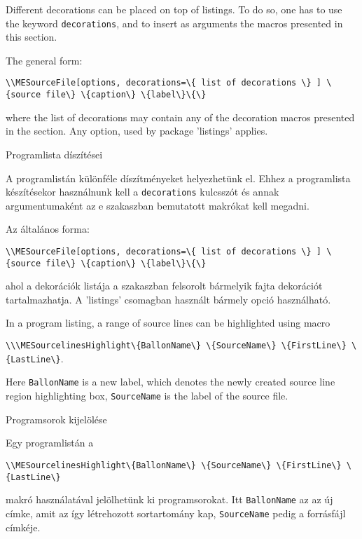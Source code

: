 {
Different decorations can be placed on top of listings.
To do so, one has to use the keyword  \lstinline|decorations|,
and to insert as arguments the macros presented in this section.

The general form:
\par\noindent\lstinline|\\MESourceFile[options,
decorations=\{
list of decorations
\}
] \{source file\} \{caption\} \{label\}\{\}|
\par\noindent where the list of decorations may contain any of the 
decoration macros presented in the section.
Any option, used by package 'listings' applies.
}
{Programlista díszítései}
{
A programlistán különféle díszítményeket helyezhetünk el.
Ehhez a programlista készítésekor használnunk kell a \lstinline|decorations| kulcsszót
és annak argumentumaként az e szakaszban bemutatott makrókat kell megadni.

Az általános forma:
\par\noindent\lstinline|\\MESourceFile[options,
decorations=\{
list of decorations
\}
] \{source file\} \{caption\} \{label\}\{\}|
\par\noindent ahol a dekorációk listája a szakaszban felsorolt 
bármelyik fajta dekorációt tartalmazhatja.
A 'listings' csomagban használt bármely opció használható.
}


{
In a program listing, a range of source lines can be highlighted using macro 
\par\noindent\lstinline|\\\MESourcelinesHighlight\{BallonName\} \{SourceName\} \{FirstLine\} \{LastLine\}|.
\par\noindent Here  \lstinline|BallonName| is a new label, which denotes the 
newly created source line region highlighting box, \lstinline|SourceName| 
is the label of the source file. 
}
{Programsorok kijelölése}
{
Egy programlistán a
\par\noindent\lstinline|\\MESourcelinesHighlight\{BallonName\} \{SourceName\} \{FirstLine\} \{LastLine\}|
\par\noindent makró használatával jelölhetünk ki programsorokat. Itt \lstinline|BallonName|
az az új címke, amit az így létrehozott sortartomány kap, \lstinline|SourceName| pedig a
forrásfájl címkéje. 
}

